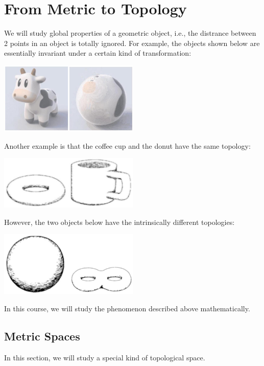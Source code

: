 \chapter{From Metric to Topology}

We will study global properties of a geometric object, i.e., the distrance between 2 points in an object is totally ignored. For example, the objects shown below are essentially invariant under a certain kind of transformation:

\begin{center}
\includegraphics[width=0.5\textwidth]{images/ch1_cow.jpg}
\end{center}
\hspace*{3em} 

Another example is that the coffee cup and the donut have the same topology:

\begin{center}
\includegraphics[width=0.5\textwidth]{images/ch1_donutmug.jpg}
\end{center}

However, the two objects below have the intrinsically different topologies:

\begin{center}
\includegraphics[width=0.5\textwidth]{images/ch1_twoholes.jpg}
\end{center}

In this course, we will study the phenomenon described above mathematically.

\section{Metric Spaces}
In this section, we will study a special kind of topological space.

